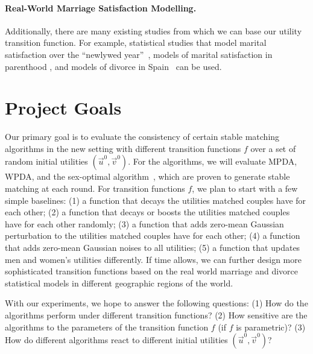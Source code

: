 \documentclass{article}
\begin{document}

\paragraph{Real-World Marriage Satisfaction Modelling.} Additionally, there are many existing studies from which we can base our utility transition function. For example, statistical studies that model marital satisfaction over the ``newlywed year''~\cite{lavner2010patterns}, models of marital satisfaction in parenthood \cite{hirschberger2009attachment}, and models of divorce in Spain~\cite{duato2013mathematical} can be used.

\section{Project Goals}
Our primary goal is to evaluate the consistency of certain stable matching algorithms in the new setting with different transition functions $f$ over a set of random initial utilities $(\overrightarrow{u}^0, \overrightarrow{v}^0)$. For the algorithms, we will evaluate MPDA, WPDA, and the sex-optimal algorithm~\cite{irving1987efficient}, which are proven to generate stable matching at each round. For transition functions $f$, we plan to start with a few simple baselines: (1) a function that decays the utilities matched couples have for each other; (2) a function that decays or boosts the utilities matched couples have for each other randomly; (3) a function that adds zero-mean Gaussian perturbation to the utilities matched couples have for each other; (4) a function that adds zero-mean Gaussian noises to all utilities; (5) a function that updates men and women's utilities differently. If time allows, we can further design more sophisticated transition functions based on the real world marriage and divorce statistical models in different geographic regions of the world.

With our experiments, we hope to answer the following questions: (1) How do the algorithms perform under different transition functions? (2) How sensitive are the algorithms to the parameters of the transition function $f$ (if $f$ is parametric)? (3) How do different algorithms react to different initial utilities $(\overrightarrow{u}^0, \overrightarrow{v}^0)$?
\end{document}
